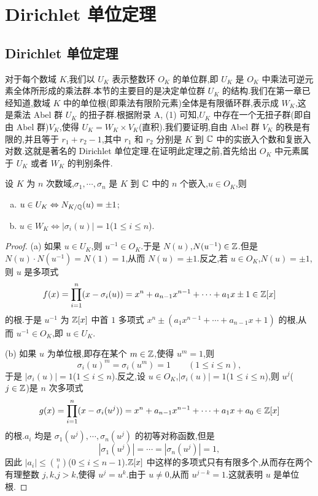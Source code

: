 \section{Dirichlet 单位定理}\label{sec:ch3-s2}

\subsection{Dirichlet 单位定理}\label{sec:ch3-s2-1}

\begin{sloppypar}
对于每个数域 $K$,我们以 $U_K$ 表示整数环 $O_K$ 的单位群,即 $U_K$ 是 $O_K$ 中乘法可逆元素全体所形成的乘法群.本节的主要目的是决定单位群 $U_K$ 的结构.我们在第一章已经知道,数域 $K$ 中的单位根(即乘法有限阶元素)全体是有限循环群,表示成 $W_K$,这是乘法 Abel 群 $U_K$ 的扭子群.根据附录 A, (1) 可知,$U_K$ 中存在一个无扭子群(即自由 Abel 群)$V_K$,使得 $U_K=W_K\times V_K$(直积).我们要证明,自由 Abel 群 $V_K$ 的秩是有限的,并且等于 $r_1+r_2-1$,其中 $r_1$ 和 $r_2$ 分别是 $K$ 到 $\mathbb{C}$ 中的实嵌入个数和复嵌入对数.这就是著名的 Dirichlet 单位定理.在证明此定理之前,首先给出 $O_K$ 中元素属于 $U_K$ 或者 $W_K$ 的判别条件.
\end{sloppypar}

\begin{lemma}\label{lem:ch3-6}
设 $K$ 为 $n$ 次数域,$\sigma_1,\cdots,\sigma_n$ 是 $K$ 到 $\mathbb{C}$ 中的 $n$ 个嵌入,$u\in O_K$,则
\begin{enumerate}[(a)]
  \item $u\in U_K\Leftrightarrow N_{K/\mathbb{Q}}(u)=\pm 1$;
  \item $u\in W_K\Leftrightarrow|\sigma_i(u)|=1$($1\leqslant i\leqslant n$).
\end{enumerate}
\end{lemma}

\begin{proof}
(a) 如果 $u\in U_K$,则 $u^{-1}\in O_K$.于是 $N(u)$,$N(u^{-1})\in\mathbb{Z}$.但是 $N(u)\cdot N(u^{-1})=N(1)=1$,从而 $N(u)=\pm 1$.反之,若 $u\in O_K$,$N(u)=\pm 1$,则 $u$ 是多项式
\[
  f(x)=\prod_{i=1}^{n}(x-\sigma_i(u))=x^n+a_{n-1}x^{n-1}+\cdots+a_1x\pm 1\in\mathbb{Z}[x]
\]
的根.于是 $u^{-1}$ 为 $\mathbb{Z}[x]$ 中首 $1$ 多项式 $x^n\pm(a_1x^{n-1}+\cdots+a_{n-1}x+1)$ 的根,从而 $u^{-1}\in O_K$,即 $u\in U_K$.

(b) 如果 $u$ 为单位根,即存在某个 $m\in\mathbb{Z}$,使得 $u^m=1$,则
\[
  \sigma_i(u)^m=\sigma_i(u^m)=1\qquad(1\leqslant i\leqslant n),
\]
于是 $|\sigma_i(u)|=1$($1\leqslant i\leqslant n$).反之,设 $u\in O_K$,$|\sigma_i(u)|=1$($1\leqslant i\leqslant n$),则 $u^j$($j\in\mathbb{Z}$)是 $n$ 次多项式
\[
  g(x)=\prod_{i=1}^{n}(x-\sigma_i(u^j))=x^n+a_{n-1}x^{n-1}+\cdots+a_1x+a_0\in\mathbb{Z}[x]
\]
的根.$a_i$ 均是 $\sigma_1(u^j),\cdots,\sigma_n(u^j)$ 的初等对称函数,但是
\[
  |\sigma_1(u^j)|=\cdots=|\sigma_n(u^j)|=1,
\]
因此 $|a_i|\leqslant\binom{n}{i}$($0\leqslant i\leqslant n-1$).$\mathbb{Z}[x]$ 中这样的多项式只有有限多个,从而存在两个有理整数 $j,k$,$j>k$,使得 $u^j=u^k$.由于 $u\neq 0$,从而 $u^{j-k}=1$.这就表明 $u$ 是单位根.
\end{proof}

